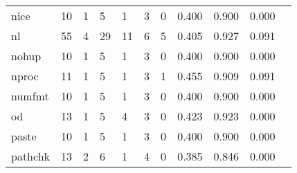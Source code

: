 \begin{longtable}{lp{1.10cm}p{1.10cm}p{1.10cm}p{1.10cm}p{1.10cm}p{1.10cm}p{1.10cm}p{1.10cm}p{1.10cm}p{1.10cm}}
nice      &                     10 &                                  1 &                                 5 &                                1 &                                 3 &                               0 &                          0.400 &                                 0.900 &                               0.000 \\
nl        &                     55 &                                  4 &                                29 &                               11 &                                 6 &                               5 &                          0.405 &                                 0.927 &                               0.091 \\
nohup     &                     10 &                                  1 &                                 5 &                                1 &                                 3 &                               0 &                          0.400 &                                 0.900 &                               0.000 \\
nproc     &                     11 &                                  1 &                                 5 &                                1 &                                 3 &                               1 &                          0.455 &                                 0.909 &                               0.091 \\
numfmt    &                     10 &                                  1 &                                 5 &                                1 &                                 3 &                               0 &                          0.400 &                                 0.900 &                               0.000 \\
od        &                     13 &                                  1 &                                 5 &                                4 &                                 3 &                               0 &                          0.423 &                                 0.923 &                               0.000 \\
paste     &                     10 &                                  1 &                                 5 &                                1 &                                 3 &                               0 &                          0.400 &                                 0.900 &                               0.000 \\
pathchk   &                     13 &                                  2 &                                 6 &                                1 &                                 4 &                               0 &                          0.385 &                                 0.846 &                               0.000 \\

\end{longtable}
